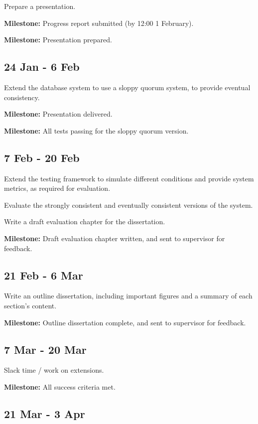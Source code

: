 Prepare a presentation.

\textbf{Milestone:} Progress report submitted (by 12:00 1 February).

\textbf{Milestone:} Presentation prepared.

\subsection*{24 Jan - 6 Feb}

Extend the database system to use a sloppy quorum system, to provide eventual consistency.

\textbf{Milestone:} Presentation delivered.

\textbf{Milestone:} All tests passing for the sloppy quorum version.


\subsection*{7 Feb - 20 Feb}

Extend the testing framework to simulate different conditions and provide system metrics, as required for evaluation.

Evaluate the strongly consistent and eventually consistent versions of the system.

Write a draft evaluation chapter for the dissertation.

\textbf{Milestone:} Draft evaluation chapter written, and sent to supervisor for feedback.


\subsection*{21 Feb - 6 Mar}

Write an outline dissertation, including important figures and a summary of each section's content.

\textbf{Milestone:} Outline dissertation complete, and sent to supervisor for feedback.


\subsection*{7 Mar - 20 Mar}

Slack time / work on extensions.

\textbf{Milestone:} All success criteria met.


\subsection*{21 Mar - 3 Apr}

